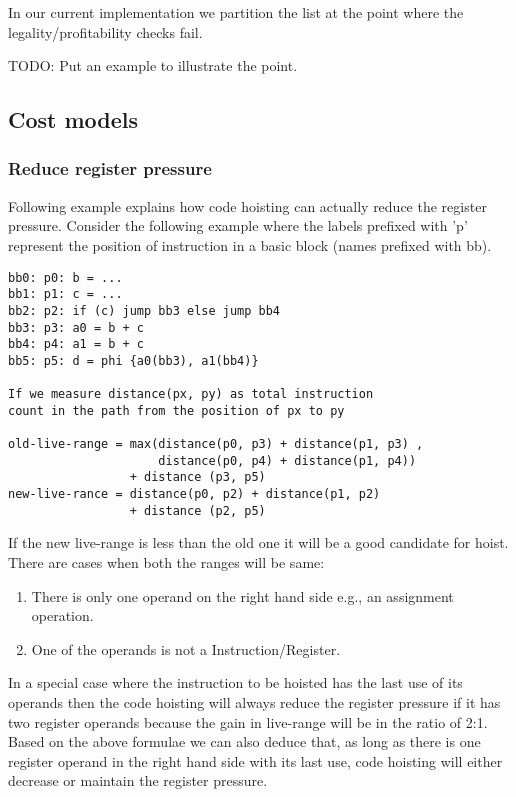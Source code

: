 \documentclass{sig-alternate}
\begin{document}
In our current implementation we partition the list at the point where the
legality/profitability checks fail.

TODO: Put an example to illustrate the point.

\subsection{Cost models}

\subsubsection{Reduce register pressure}
\label{hoist:reg-pressure}
Following example explains how code hoisting can actually reduce the register pressure.
Consider the following example where the labels prefixed with 'p' represent the position of
instruction in a basic block (names prefixed with bb).

\begin{verbatim}
bb0: p0: b = ...
bb1: p1: c = ...
bb2: p2: if (c) jump bb3 else jump bb4
bb3: p3: a0 = b + c
bb4: p4: a1 = b + c
bb5: p5: d = phi {a0(bb3), a1(bb4)}

If we measure distance(px, py) as total instruction
count in the path from the position of px to py

old-live-range = max(distance(p0, p3) + distance(p1, p3) ,
                     distance(p0, p4) + distance(p1, p4))
                 + distance (p3, p5)
new-live-rance = distance(p0, p2) + distance(p1, p2)
                 + distance (p2, p5)
\end{verbatim}

If the new live-range is less than the old one it will be a good candidate
for hoist. There are cases when both the ranges will be same:
\begin{enumerate}
  \item There is only one operand on the right hand side e.g., an assignment operation.
  \item One of the operands is not a Instruction/Register.
\end{enumerate}

In a special case where the instruction to be hoisted has the last use of its
operands then the code hoisting will always reduce the register pressure if it
has two register operands because the gain in live-range will be in the ratio of
2:1. Based on the above formulae we can also deduce that, as long as there is
one register operand in the right hand side with its last use, code hoisting
will either decrease or maintain the register pressure.
\end{document}
